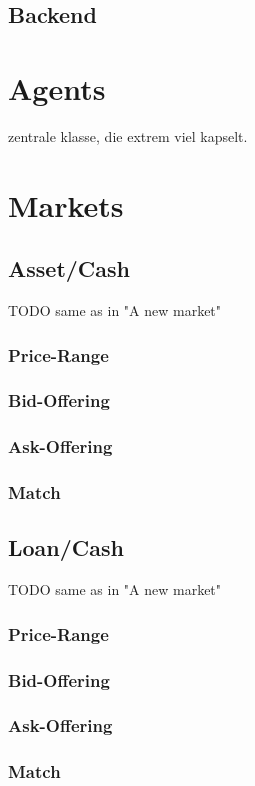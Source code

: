 \documentclass[Bachelorarbeit.tex]{subfiles}
\begin{document}
\subsection{Backend}

\section{Agents}
zentrale klasse, die extrem viel kapselt.

\section{Markets}
\subsection{Asset/Cash}
TODO same as in "A new market"
\subsubsection{Price-Range}
\subsubsection{Bid-Offering}
\subsubsection{Ask-Offering}
\subsubsection{Match}

\subsection{Loan/Cash}
TODO same as in "A new market"
\subsubsection{Price-Range}
\subsubsection{Bid-Offering}
\subsubsection{Ask-Offering}
\subsubsection{Match}
\end{document}
